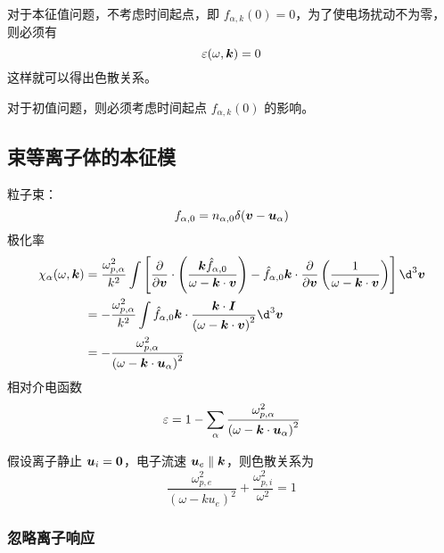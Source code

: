 对于本征值问题，不考虑时间起点，即 $f_{\alpha,k}(0) = 0$，为了使电场扰动不为零，则必须有
\begin{equation}
\varepsilon(\omega, \bm{k}) = 0
\end{equation}
这样就可以得出色散关系。

对于初值问题，则必须考虑时间起点 $f_{\alpha,k}(0)$ 的影响。

\subsection{束等离子体的本征模}

粒子束：
\begin{equation}
f_{\alpha,0} = n_{\alpha,0} \delta(\bm{v} - \bm{u}_\alpha)
\end{equation}
极化率
\begin{equation}\begin{aligned}
\chi_\alpha(\omega, \vector{k}) &= \frac{\omega_{p,\alpha}^2}{k^2} \int \left[
\pdv{}{\vector{v}} \cdot \left( \frac{\vector{k} \hat{f}_{\alpha,0}}{\omega - \vector{k} \cdot \vector{v}} \right)
- \hat{f}_{\alpha,0} \vector{k} \cdot \pdv{}{\vector{v}}\left( \frac{1}{\omega - \vector{k} \cdot \vector{v}} \right)
\right] \d^3 \vector{v} \\
&= - \frac{\omega_{p,\alpha}^2}{k^2} \int
\hat{f}_{\alpha,0} \vector{k} \cdot \frac{\vector{k} \cdot \vector{I}}{\left( \omega - \vector{k} \cdot \vector{v} \right)^2}
\d^3 \vector{v} \\
&= - \frac{\omega_{p,\alpha}^2}{\left( \omega - \vector{k} \cdot \vector{u}_\alpha \right)^2}
\end{aligned}\end{equation}
相对介电函数
\begin{equation}
\varepsilon = 1 - \sum_\alpha \frac{\omega_{p,\alpha}^2}{\left( \omega - \bm{k} \cdot \bm{u}_\alpha \right)^2}
\end{equation}

假设离子静止 $\bm{u}_i = \bm{0}$，电子流速 $\bm{u}_e \parallel \bm{k}$，则色散关系为
\begin{equation}
\frac{\omega_{p,e}^2}{\left( \omega - k u_e \right)^2} + \frac{\omega_{p,i}^2}{\omega^2} = 1
\end{equation}

\subsubsection{忽略离子响应}

